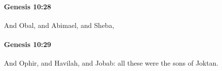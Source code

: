 		\paragraph{Genesis 10:28} %
			\label{GENESIS-10-28}

			And Obal, and Abimael, and Sheba,


		\paragraph{Genesis 10:29} %
			\label{GENESIS-10-29}

			And Ophir, and Havilah, and Jobab: all these were the sons of Joktan.


